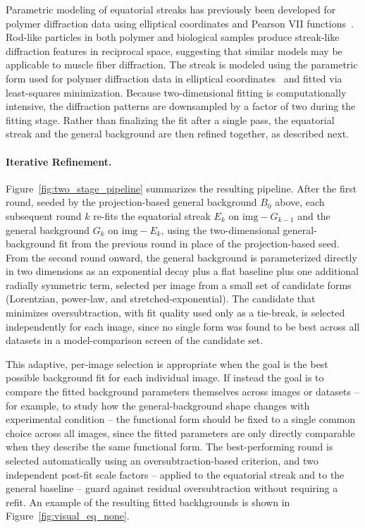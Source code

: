 \documentclass[iucr]{iucrjournals}
\begin{document}
Parametric modeling of equatorial streaks has previously been developed for polymer diffraction data using elliptical coordinates and Pearson VII functions~\cite{MurthyZeroGrubb1997}. Rod-like particles in both polymer and biological samples produce streak-like diffraction features in reciprocal space, suggesting that similar models may be applicable to muscle fiber diffraction. The streak is modeled using the parametric form used for polymer diffraction data in elliptical coordinates~\cite{MurthyZeroGrubb1997} and fitted via least-squares minimization. Because two-dimensional fitting is computationally intensive, the diffraction patterns are downsampled by a factor of two during the fitting stage. Rather than finalizing the fit after a single pass, the equatorial streak and the general background are then refined together, as described next.


\paragraph{Iterative Refinement.}

Figure~\ref{fig:two_stage_pipeline} summarizes the resulting pipeline. After the first round, seeded by the projection-based general background $B_0$ above, each subsequent round $k$ re-fits the equatorial streak $E_k$ on $\mathrm{img} - G_{k-1}$ and the general background $G_k$ on $\mathrm{img} - E_k$, using the two-dimensional general-background fit from the previous round in place of the projection-based seed. From the second round onward, the general background is parameterized directly in two dimensions as an exponential decay plus a flat baseline plus one additional radially symmetric term, selected per image from a small set of candidate forms (Lorentzian, power-law, and stretched-exponential). The candidate that minimizes oversubtraction, with fit quality used only as a tie-break, is selected independently for each image, since no single form was found to be best across all datasets in a model-comparison screen of the candidate set.


This adaptive, per-image selection is appropriate when the goal is the best possible background fit for each individual image. If instead the goal is to compare the fitted background parameters themselves across images or datasets -- for example, to study how the general-background shape changes with experimental condition -- the functional form should be fixed to a single common choice across all images, since the fitted parameters are only directly comparable when they describe the same functional form. The best-performing round is selected automatically using an oversubtraction-based criterion, and two independent post-fit scale factors -- applied to the equatorial streak and to the general baseline -- guard against residual oversubtraction without requiring a refit. An example of the resulting fitted backhgrounds is shown in Figure~\ref{fig:visual_eq_none}.
\end{document}
